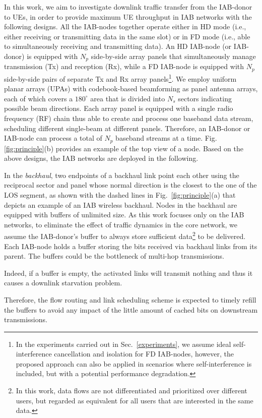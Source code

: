 In this work, we aim to investigate downlink traffic transfer from the IAB-donor to UEs, in order to provide maximum UE throughput in IAB networks with the following designs. 
All the IAB-nodes together operate either in HD mode (i.e., either receiving or transmitting data in the same slot) or in FD mode (i.e., able to simultaneously receiving and transmitting data). An HD IAB-node (or IAB-donor) is equipped with $N_p$ side-by-side array panels that simultaneously manage transmission (Tx) and reception (Rx), while a FD IAB-node is equipped with $N_p$ side-by-side pairs of separate Tx and Rx array panels\footnote{In the experiments carried out in Sec.~\ref{experiments}, we assume ideal self-interference cancellation and isolation for FD IAB-nodes, however, the proposed approach can also be applied in scenarios where self-interference is included, but with a potential performance degradation.}\cite{xiao2017full}. We employ uniform planar arrays (UPAs) with codebook-based beamforming as panel antenna arrays, each of which covers a $180^\circ$ area that is divided into $N_s$ sectors indicating possible beam directions. Each array panel is equipped with a single radio frequency (RF) chain thus able to create and process one baseband data stream, scheduling different single-beam at different panels. Therefore, an IAB-donor or IAB-node can process a total of $N_p$ baseband streams at a time. Fig. \ref{fig:principle}(b) provides an example of the top view of a node.
Based on the above designs, the IAB networks are deployed in the following.

In the \textit{backhaul}, two endpoints of a backhaul link point each other using the reciprocal sector and panel whose normal direction is the closest to the one of the LOS segment, as shown with the dashed lines in Fig.~\ref{fig:principle}(a) that depicts an example of an IAB wireless backhaul.
Nodes in the backhaul are equipped with buffers of unlimited size. As this work focuses only on the IAB networks, to eliminate the effect of traffic dynamics in the core network, we assume the IAB-donor's buffer to always store sufficient data\footnote{In this work, data flows are not differentiated and prioritized over different users, but regarded as equivalent for all users that are interested in the same data.}
to be delivered.
Each IAB-node holds a buffer storing the bits received via backhaul links from its parent. The buffers could be the bottleneck of multi-hop transmissions. \begin{changed}Indeed, if a buffer is empty, the activated links will transmit nothing and thus it causes a downlink starvation problem.\end{changed}
Therefore, the flow routing and link scheduling scheme is expected to timely refill the buffers to avoid any impact of the little amount of cached bits on downstream transmissions.

